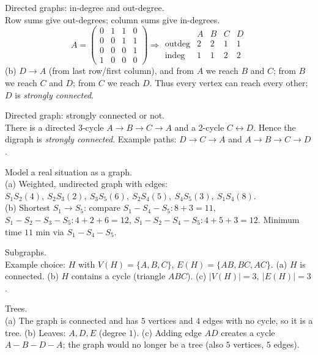 \documentclass[11pt]{article}
\def\textbf#1{#1}%
\begin{document}
\begin{solution}
\textbf{Directed graphs: in-degree and out-degree.}\\
Row sums give out-degrees; column sums give in-degrees.
\[
A=
\begin{pmatrix}
0&1&1&0\\
0&0&1&1\\
0&0&0&1\\
1&0&0&0
\end{pmatrix}
\Rightarrow
\begin{array}{c|cccc}
& A & B & C & D\\ \hline
\text{outdeg} & 2 & 2 & 1 & 1\\
\text{indeg}  & 1 & 1 & 2 & 2
\end{array}
\]
(b) \(D\to A\) (from last row/first column), and from \(A\) we reach \(B\) and \(C\); from \(B\) we reach \(C\) and \(D\); from \(C\) we reach \(D\).  
Thus every vertex can reach every other; \(D\) is \emph{strongly connected}.
\end{solution}

\begin{solution}
\textbf{Directed graph: strongly connected or not.}\\
There is a directed 3-cycle \(A\to B\to C\to A\) and a 2-cycle \(C\leftrightarrow D\).  
Hence the digraph is \emph{strongly connected}. Example paths: \(D\to C\to A\) and \(A\to B\to C\to D\).
\end{solution}

\begin{solution}
\textbf{Model a real situation as a graph.}\\
(a) Weighted, undirected graph with edges:
\(S_1S_2(4),\ S_2S_3(2),\ S_3S_5(6),\ S_2S_4(5),\ S_4S_5(3),\ S_1S_4(8)\).\\
(b) Shortest \(S_1\to S_5\): compare
\(S_1\!-\!S_4\!-\!S_5: 8+3=11\),
\(S_1\!-\!S_2\!-\!S_3\!-\!S_5: 4+2+6=12\),
\(S_1\!-\!S_2\!-\!S_4\!-\!S_5: 4+5+3=12\).
Minimum time \(\boxed{11\text{ min}}\) via \(S_1\!-\!S_4\!-\!S_5\).
\end{solution}

\begin{solution}
\textbf{Subgraphs.}\\
Example choice: \(H\) with \(V(H)=\{A,B,C\}\), \(E(H)=\{AB,BC,AC\}\).  
(a) \(H\) is connected. (b) \(H\) contains a cycle (triangle \(ABC\)).  
(c) \(|V(H)|=3,\ |E(H)|=3\).
\end{solution}

\begin{solution}
\textbf{Trees.}\\
(a) The graph is connected and has \(5\) vertices and \(4\) edges with no cycle, so it is a tree.  
(b) Leaves: \(A,D,E\) (degree \(1\)).  
(c) Adding edge \(AD\) creates a cycle \(A\!-\!B\!-\!D\!-\!A\); the graph would no longer be a tree (also \(5\) vertices, \(5\) edges).
\end{solution}
\end{document}
